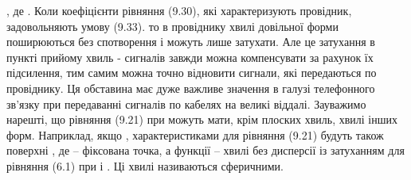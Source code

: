  , де  .
Коли коефіцієнти рівняння (9.30), які характеризують провідник, задовольняють умову (9.33). то в провіднику хвилі довільної форми поширюються без спотворення і можуть лише затухати. Але це затухання в пункті прийому хвиль - сигналів завжди можна компенсувати за рахунок їх підсилення, тим самим можна точно відновити сигнали, які передаються по провіднику.
Ця обставина має дуже важливе значення в галузі телефонного зв’язку при передаванні сигналів по кабелях на великі віддалі.
Зауважимо нарешті, що рівняння (9.21) при   можуть мати, крім плоских хвиль, хвилі інших форм. Наприклад, якщо  , характеристиками для рівняння (9.21) будуть також поверхні
 , де   – фіксована точка, а функції   – хвилі без дисперсії із затуханням для рівняння (6.1) при   і  . Ці хвилі називаються сферичними.



